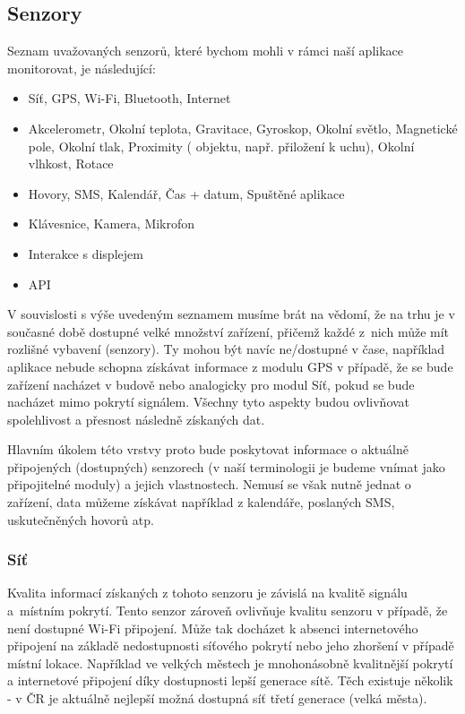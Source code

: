 \documentclass[thesis=M,czech]{FITthesis}[2012/06/26]
\begin{document}
\subsection{Senzory}
Seznam uvažovaných senzorů, které bychom mohli v rámci naší aplikace monitorovat, je následující:

\begin{itemize}
\item    Síť, GPS, Wi-Fi, Bluetooth, Internet
\item    Akcelerometr, Okolní teplota, Gravitace, Gyroskop, Okolní světlo, Magnetické pole, Okolní tlak, Proximity ( objektu, např. přiložení k uchu), Okolní vlhkost, Rotace
\item    Hovory, SMS, Kalendář, Čas + datum, Spuštěné aplikace
\item    Klávesnice, Kamera, Mikrofon
\item    Interakce s displejem
\item    API
\end{itemize}

V souvislosti s výše uvedeným seznamem musíme brát na vědomí, že na trhu je v současné době dostupné velké množství zařízení, přičemž každé z~nich může mít rozlišné vybavení (senzory). Ty mohou být navíc ne/dostup\-né v čase, například aplikace nebude schopna získávat informace z modulu GPS v případě, že se bude zařízení nacházet v budově nebo analogicky pro modul Síť, pokud se bude nacházet mimo pokrytí signálem. Všechny tyto aspekty budou ovlivňovat spolehlivost a přesnost následně získaných dat.

Hlavním úkolem této vrstvy proto bude poskytovat informace o aktuálně připojených (dostupných) senzorech (v naší terminologii je budeme vnímat jako připojitelné moduly) a jejich vlastnostech. Nemusí se však nutně jednat o  zařízení, data můžeme získávat například z kalendáře, poslaných SMS, uskutečněných hovorů atp.

\subsubsection*{Síť}
Kvalita informací získaných z tohoto senzoru je závislá na kvalitě signálu a~místním pokrytí. Tento senzor zároveň ovlivňuje kvalitu senzoru  v případě, že není dostupné Wi-Fi připojení. Může tak docházet k absenci internetového připojení na základě nedostupnosti síťového pokrytí nebo jeho zhoršení v případě místní lokace. Například ve velkých městech je mnohonásobně kvalitnější pokrytí a internetové připojení díky dostupnosti lepší generace sítě. Těch existuje několik - v ČR je aktuálně nejlepší možná dostupná síť třetí generace (velká města).
\end{document}
